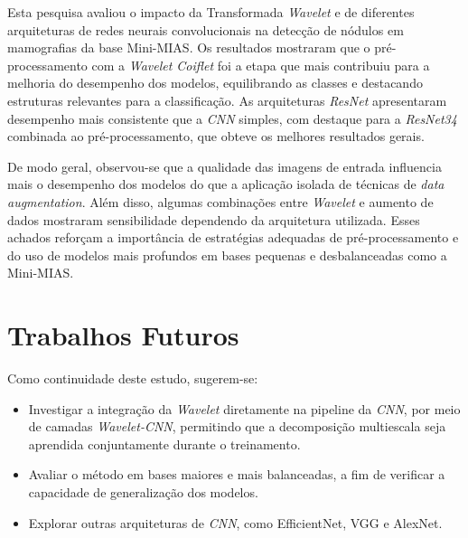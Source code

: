 Esta pesquisa avaliou o impacto da Transformada \textit{Wavelet} e de diferentes arquiteturas de redes neurais convolucionais na detecção de nódulos em mamografias da base Mini-MIAS. Os resultados mostraram que o pré-processamento com a \textit{Wavelet Coiflet} foi a etapa que mais contribuiu para a melhoria do desempenho dos modelos, equilibrando as classes e destacando estruturas relevantes para a classificação. As arquiteturas \textit{ResNet} apresentaram desempenho mais consistente que a \textit{CNN} simples, com destaque para a \textit{ResNet34} combinada ao pré-processamento, que obteve os melhores resultados gerais.

De modo geral, observou-se que a qualidade das imagens de entrada influencia mais o desempenho dos modelos do que a aplicação isolada de técnicas de \textit{data augmentation}. Além disso, algumas combinações entre \textit{Wavelet} e aumento de dados mostraram sensibilidade dependendo da arquitetura utilizada. Esses achados reforçam a importância de estratégias adequadas de pré-processamento e do uso de modelos mais profundos em bases pequenas e desbalanceadas como a Mini-MIAS.

\section{Trabalhos Futuros}

Como continuidade deste estudo, sugerem-se:

\begin{itemize}
    \item Investigar a integração da \textit{Wavelet} diretamente na pipeline da \textit{CNN}, por meio de camadas \textit{Wavelet-CNN}, permitindo que a decomposição multiescala seja aprendida conjuntamente durante o treinamento.
    \item Avaliar o método em bases maiores e mais balanceadas, a fim de verificar a capacidade de generalização dos modelos.
    \item Explorar outras arquiteturas de \textit{CNN}, como EfficientNet, VGG e AlexNet.
\end{itemize}

